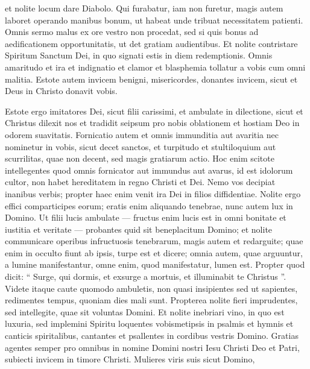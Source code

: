 \begin{biblechapter}
\begin{biblechapter}
\begin{biblechapter}
\begin{biblechapter}
\verse et nolite locum dare Diabolo. 
\verse Qui furabatur, iam non furetur, magis autem laboret operando manibus bonum, ut habeat unde tribuat necessitatem patienti. 
\verse Omnis sermo malus ex ore vestro non procedat, sed si quis bonus ad aedificationem opportunitatis, ut det gratiam audientibus. 
\verse Et nolite contristare Spiritum Sanctum Dei, in quo signati estis in diem redemptionis.
 \verse Omnis amaritudo et ira et indignatio et clamor et blasphemia tollatur a vobis cum omni malitia. 
\verse Estote autem invicem benigni, misericordes, donantes invicem, sicut et Deus in Christo donavit vobis.
 
\begin{biblechapter}
\verse Estote ergo imitatores Dei, sicut filii carissimi, 
\verse et ambulate in dilectione, sicut et Christus dilexit nos et tradidit seipsum pro nobis oblationem et hostiam Deo in odorem suavitatis.
 \verse Fornicatio autem et omnis immunditia aut avaritia nec nominetur in vobis, sicut decet sanctos, 
\verse et turpitudo et stultiloquium aut scurrilitas, quae non decent, sed magis gratiarum actio. 
\verse Hoc enim scitote intellegentes quod omnis fornicator aut immundus aut avarus, id est idolorum cultor, non habet hereditatem in regno Christi et Dei.
 \verse Nemo vos decipiat inanibus verbis; propter haec enim venit ira Dei in filios diffidentiae. 
\verse Nolite ergo effici comparticipes eorum; 
\verse eratis enim aliquando tenebrae, nunc autem lux in Domino. Ut filii lucis ambulate 
\verse — fructus enim lucis est in omni bonitate et iustitia et veritate — 
\verse probantes quid sit beneplacitum Domino; 
\verse et nolite communicare operibus infructuosis tenebrarum, magis autem et redarguite; 
\verse quae enim in occulto fiunt ab ipsis, turpe est et dicere; 
\verse omnia autem, quae arguuntur, a lumine manifestantur, 
\verse omne enim, quod manifestatur, lumen est. Propter quod dicit: “ Surge, qui dormis, et exsurge a mortuis, et illuminabit te Christus ”.
 \verse Videte itaque caute quomodo ambuletis, non quasi insipientes sed ut sapientes, 
\verse redimentes tempus, quoniam dies mali sunt. 
\verse Propterea nolite fieri imprudentes, sed intellegite, quae sit voluntas Domini. 
\verse Et nolite inebriari vino, in quo est luxuria, sed implemini Spiritu 
\verse loquentes vobismetipsis in psalmis et hymnis et canticis spiritalibus, cantantes et psallentes in cordibus vestris Domino. 
\verse Gratias agentes semper pro omnibus in nomine Domini nostri Iesu Christi Deo et Patri, 
\verse subiecti invicem in timore Christi.
 \verse Mulieres viris suis sicut Domino, 

\end{biblechapter}
\end{biblechapter}
\end{biblechapter}
\end{biblechapter}
\end{biblechapter}

